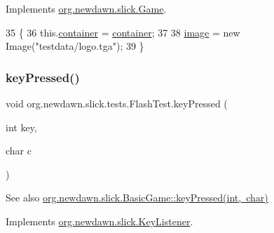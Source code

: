 Implements \mbox{\hyperlink{interfaceorg_1_1newdawn_1_1slick_1_1_game_ad2dd6affab08bb8fdb5fab0815957b7a}{org.\+newdawn.\+slick.\+Game}}.


\begin{DoxyCode}
35                                                                     \{
36         this.\mbox{\hyperlink{classorg_1_1newdawn_1_1slick_1_1tests_1_1_flash_test_ad78e2796710293c14d8913b36a8e9e01}{container}} = \mbox{\hyperlink{classorg_1_1newdawn_1_1slick_1_1tests_1_1_flash_test_ad78e2796710293c14d8913b36a8e9e01}{container}};
37         
38         \mbox{\hyperlink{classorg_1_1newdawn_1_1slick_1_1tests_1_1_flash_test_af72465c4320b1f9ceb938886132ccf84}{image}} = \textcolor{keyword}{new} Image(\textcolor{stringliteral}{"testdata/logo.tga"});
39     \}
\end{DoxyCode}
\mbox{\label{classorg_1_1newdawn_1_1slick_1_1tests_1_1_flash_test_acfd37557299ed60c45dbdc823ab892ac}} 
\subsubsection{\texorpdfstring{key\+Pressed()}{keyPressed()}}
{\footnotesize\ttfamily void org.\+newdawn.\+slick.\+tests.\+Flash\+Test.\+key\+Pressed (\begin{DoxyParamCaption}\item[{int}]{key,  }\item[{char}]{c }\end{DoxyParamCaption})\hspace{0.3cm}{\ttfamily [inline]}}

\begin{DoxySeeAlso}{See also}
\mbox{\hyperlink{classorg_1_1newdawn_1_1slick_1_1_basic_game_a4fbb3345b5abf5ddd54a99466d07f02f}{org.\+newdawn.\+slick.\+Basic\+Game\+::key\+Pressed(int, char)}} 
\end{DoxySeeAlso}


Implements \mbox{\hyperlink{interfaceorg_1_1newdawn_1_1slick_1_1_key_listener_ac0b0568a21ef486c4f51382614c196ef}{org.\+newdawn.\+slick.\+Key\+Listener}}.


